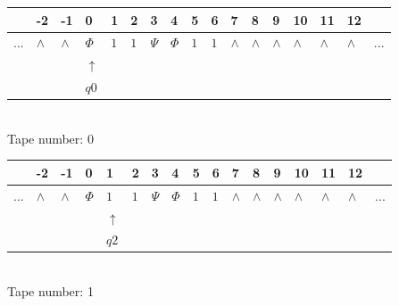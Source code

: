 \documentclass[11pt]{article}
\begin{document}
\begin{table}[H]
\centering
\begin{tabular}{lllllllllllllllll}
 & -2 & -1 & 0 & 1 & 2 & 3 & 4 & 5 & 6 & 7 & 8 & 9 & 10 & 11 & 12 & \\
\hline
$...$ & \multicolumn{1}{|l|}{$\wedge$} & \multicolumn{1}{|l|}{$\wedge$} & \multicolumn{1}{|l|}{$\Phi$} & \multicolumn{1}{|l|}{$1$} & \multicolumn{1}{|l|}{$1$} & \multicolumn{1}{|l|}{$\Psi$} & \multicolumn{1}{|l|}{$\Phi$} & \multicolumn{1}{|l|}{$1$} & \multicolumn{1}{|l|}{$1$} & \multicolumn{1}{|l|}{$\wedge$} & \multicolumn{1}{|l|}{$\wedge$} & \multicolumn{1}{|l|}{$\wedge$} & \multicolumn{1}{|l|}{$\wedge$} & \multicolumn{1}{|l|}{$\wedge$} & \multicolumn{1}{|l|}{$\wedge$} & $...$\\
\hline
&  &  & $\uparrow$ &  &  &  &  &  &  &  &  &  &  &  &  &  \\
&  &  & $ q0 $ &  &  &  &  &  &  &  &  &  &  &  &  &  \\
\end{tabular}
\\
Tape number: 0
\noindent\makebox[\linewidth]{\hdashrule{\textwidth}{1pt}{1pt}}\end{table}

\begin{table}[H]
\centering
\begin{tabular}{lllllllllllllllll}
 & -2 & -1 & 0 & 1 & 2 & 3 & 4 & 5 & 6 & 7 & 8 & 9 & 10 & 11 & 12 & \\
\hline
$...$ & \multicolumn{1}{|l|}{$\wedge$} & \multicolumn{1}{|l|}{$\wedge$} & \multicolumn{1}{|l|}{$\Phi$} & \multicolumn{1}{|l|}{$1$} & \multicolumn{1}{|l|}{$1$} & \multicolumn{1}{|l|}{$\Psi$} & \multicolumn{1}{|l|}{$\Phi$} & \multicolumn{1}{|l|}{$1$} & \multicolumn{1}{|l|}{$1$} & \multicolumn{1}{|l|}{$\wedge$} & \multicolumn{1}{|l|}{$\wedge$} & \multicolumn{1}{|l|}{$\wedge$} & \multicolumn{1}{|l|}{$\wedge$} & \multicolumn{1}{|l|}{$\wedge$} & \multicolumn{1}{|l|}{$\wedge$} & $...$\\
\hline
&  &  &  & $\uparrow$ &  &  &  &  &  &  &  &  &  &  &  &  \\
&  &  &  & $ q2 $ &  &  &  &  &  &  &  &  &  &  &  &  \\
\end{tabular}
\\
Tape number: 1
\noindent\makebox[\linewidth]{\hdashrule{\textwidth}{1pt}{1pt}}\end{table}
\end{document}
